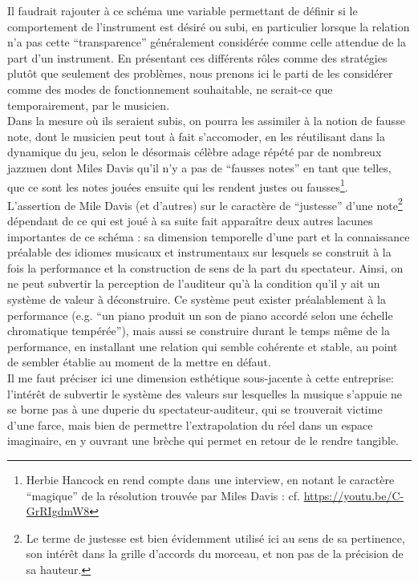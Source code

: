\indent Il faudrait rajouter à ce schéma une variable permettant de définir si le comportement de l'instrument est désiré ou subi, en particulier lorsque la relation n'a pas cette ``transparence'' généralement considérée comme celle attendue de la part d'un instrument. En présentant ces différents rôles comme des stratégies plutôt que seulement des problèmes, nous prenons ici le parti de les considérer comme des modes de fonctionnement souhaitable, ne serait-ce que temporairement, par le musicien.\\
\indent Dans la mesure où ils seraient subis, on pourra les assimiler à la notion de fausse note, dont le musicien peut tout à fait s'accomoder, en les réutilisant dans la dynamique du jeu, selon le désormais célèbre adage répété par de nombreux jazzmen dont Miles Davis qu'il n'y a pas de ``fausses notes'' en tant que telles, que ce sont les notes jouées ensuite qui les rendent justes ou fausses\footnote{Herbie Hancock en rend compte dans une interview, en notant le caractère ``magique'' de la résolution trouvée par Miles Davis :  cf. \url{https://youtu.be/C-GrRIgdmW8}}.\\
\indent L'assertion de Mile Davis (et d'autres) sur le caractère de ``justesse'' d'une note\footnote{Le terme de justesse est bien évidemment utilisé ici au sens de sa pertinence, son intérêt dans la grille d'accords du morceau, et non pas de la précision de sa hauteur.} dépendant de ce qui est joué à sa suite fait apparaître deux autres lacunes importantes de ce schéma : sa dimension temporelle d'une part et la connaissance préalable des idiomes musicaux et instrumentaux sur lesquels se construit à la fois la performance et la construction de sens de la part du spectateur. Ainsi, on ne peut subvertir la perception de l'auditeur qu'à la condition qu'il y ait un système de valeur à déconstruire. Ce système peut exister préalablement à la performance (e.g. ``un piano produit un son de piano accordé selon une échelle chromatique tempérée''), mais aussi se construire durant le temps même de la performance, en installant une relation qui semble cohérente et stable, au point de sembler établie au moment de la mettre en défaut.\\
\indent Il me faut préciser ici une dimension esthétique sous-jacente à cette entreprise: l'intérêt de subvertir le système des valeurs sur lesquelles la musique s'appuie ne se borne pas à une duperie du spectateur-auditeur, qui se trouverait victime d'une farce, mais bien de permettre l'extrapolation du réel dans un espace imaginaire, en y ouvrant une brèche qui permet en retour de le rendre tangible.

